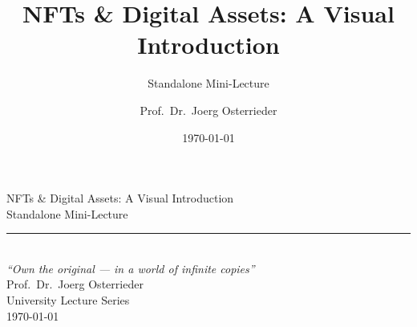 \documentclass[8pt,aspectratio=169]{beamer}
\title{NFTs \& Digital Assets: A Visual Introduction}
\subtitle{Standalone Mini-Lecture}
\author{Prof.~Dr.~Joerg Osterrieder}
\institute{University Lecture Series}
\date{\today}
\begin{document}
\begin{frame}[plain]
\vspace{2cm}
\begin{center}
{\Huge\color{mlpurple} NFTs \& Digital Assets: A Visual Introduction}\\[0.4cm]
{\Large\color{mlblue} Standalone Mini-Lecture}\\[0.3cm]
\textcolor{mlgray}{\rule{6cm}{0.4pt}}\\[0.3cm]
{\small\itshape ``Own the original --- in a world of infinite copies''}\\[1.5cm]
{\normalsize Prof.~Dr.~Joerg Osterrieder}\\[0.2cm]
{\small University Lecture Series}\\[0.2cm]
{\small \today}
\end{center}
\end{frame}
\end{document}
